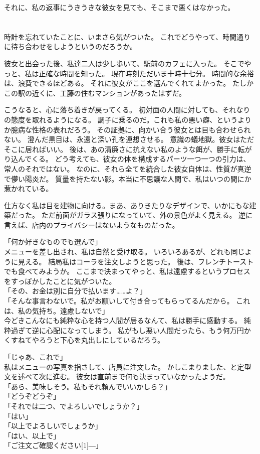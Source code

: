 \documentclass[../HiganMain]{subfiles}
\begin{document}
それに、私の返事にうきうきな彼女を見ても、そこまで悪くはなかった。

\section{}
時計を忘れていたことに、いまさら気がついた。
これでどうやって、時間通りに待ち合わせをしようというのだろうか。

彼女と出会った後、私達二人は少し歩いて、駅前のカフェに入った。
そこでやっと、私は正確な時間を知った。
現在時刻ただいま十時十七分。
時間的な余裕は、浪費できるほどある。
それに彼女がここを選んでくれてよかった。
たしかこの駅の近くに、工藤の住むマンションがあったはずだ。

こうなると、心に落ち着きが戻ってくる。
初対面の人間に対しても、それなりの態度を取れるようになる。
調子に乗るのだ。これも私の悪い癖、というよりか臆病な性格の表れだろう。
その証拠に、向かい合う彼女とは目も合わせられない。
澄んだ黒目は、永遠と深い孔を連想させる。
意識の蟻地獄。彼女はただそこに居ればいい。
後は、あの清廉さに抗えない私のような餌が、勝手に転がり込んでくる。
どう考えても、彼女の体を構成するパーツ一つ一つの引力は、常人のそれではない。
なのに、それら全てを統合した彼女自体は、性質が真逆で儚い陽炎だ。
質量を持たない影。本当に不思議な人間で、私はいつの間にか惹かれている。

仕方なく私は目を建物に向ける。まあ、ありきたりなデザインで、いかにもな建築だった。
ただ前面がガラス張りになっていて、外の景色がよく見える。
逆に言えば、店内のプライバシーはないようなものだった。

「何か好きなものでも選んで」\\
メニューを差し出され、私は自然と受け取る。
いろいろあるが、どれも同じように見える。
結局私はコーラを注文しようと思った。
後は、フレンチトーストでも食べてみようか。
ここまで決まってやっと、私は遠慮するというプロセスをすっぽかしたことに気がついた。\\
「その、お金は別に自分で払います……よ？」\\
「そんな事言わないで。私がお願いして付き合ってもらってるんだから。
これは、私の気持ち。遠慮しないで」\\
今どきこんなにも純粋な心を持つ人間が居るなんて、私は勝手に感動する。
純粋過ぎて逆に心配になってしまう。
私がもし悪い人間だったら、もう何万円かくすねてやろうと下心を丸出しにしているだろう。

「じゃあ、これで」\\
私はメニューの写真を指さして、店員に注文した。
かしこまりました、と定型文を述べて次に進む。
彼女は直前まで何も決まっていなかったようだ。\\
「あら、美味しそう。私もそれ頼んでいいかしら？」\\
「どうぞどうぞ」\\
「それでは二つ、でよろしいでしょうか？」\\
「はい」\\
「以上でよろしいでしょうか」\\
「はい、以上で」\\
「ご注文ご確認ください\scalebox{3}[1]{―}」
\end{document}
